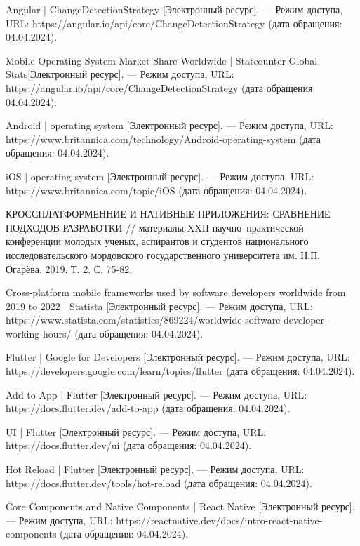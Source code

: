 \begin{thebibliography}{}
	Angular | ChangeDetectionStrategy [Электронный ресурс]. --- Режим доступа, URL:  https://angular.io/api/core/ChangeDetectionStrategy (дата обращения: 04.04.2024).
	
	Mobile Operating System Market Share Worldwide | Statcounter Global Stats[Электронный ресурс]. --- Режим доступа, URL:  https://angular.io/api/core/ChangeDetectionStrategy (дата обращения: 04.04.2024).
	
	Android | operating system [Электронный ресурс]. --- Режим доступа, URL:  https://www.britannica.com/technology/Android-operating-system (дата обращения: 04.04.2024).
	
	iOS | operating system [Электронный ресурс]. --- Режим доступа, URL: https://www.britannica.com/topic/iOS (дата обращения: 04.04.2024).
	
	КРОССПЛАТФОРМЕННИЕ И НАТИВНЫЕ ПРИЛОЖЕНИЯ: СРАВНЕНИЕ ПОДХОДОВ РАЗРАБОТКИ // материалы XXII научно--практической конференции молодых ученых, аспирантов и студентов национального исследовательского мордовского государственного университета им. Н.П. Огарёва. 2019. Т. 2. С. 75-82.
	
	Cross-platform mobile frameworks used by software developers worldwide from 2019 to 2022 | Statista [Электронный ресурс]. --- Режим доступа, URL: https://www.statista.com/statistics/869224/worldwide-software-developer-working-hours/ (дата обращения: 04.04.2024).
	
	Flutter | Google for Developers [Электронный ресурс]. --- Режим доступа, URL: https://developers.google.com/learn/topics/flutter (дата обращения: 04.04.2024).
	
	Add to App | Flutter [Электронный ресурс]. --- Режим доступа, URL: https://docs.flutter.dev/add-to-app (дата обращения: 04.04.2024).
	
	UI | Flutter [Электронный ресурс]. --- Режим доступа, URL: https://docs.flutter.dev/ui (дата обращения: 04.04.2024).
	
	Hot Reload | Flutter [Электронный ресурс]. --- Режим доступа, URL: https://docs.flutter.dev/tools/hot-reload (дата обращения: 04.04.2024).
	
	Core Components and Native Components | React Native [Электронный ресурс]. --- Режим доступа, URL: https://reactnative.dev/docs/intro-react-native-components (дата обращения: 04.04.2024).
	

\end{thebibliography}
